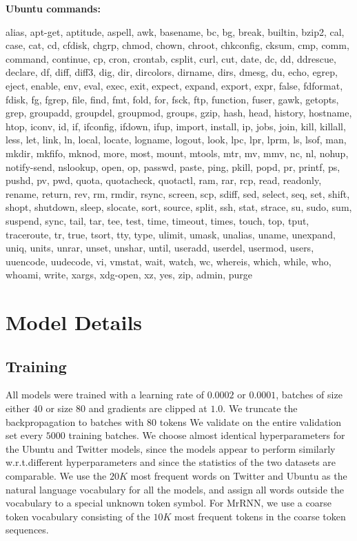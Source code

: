 \documentclass{article}
\begin{document}
\textbf{Ubuntu commands:}
\begin{framed}
\scriptsize
alias, apt-get, aptitude, aspell, awk, basename, bc, bg, break, builtin, bzip2, cal, case, cat, cd, cfdisk, chgrp, chmod, chown, chroot, chkconfig, cksum, cmp, comm, command, continue, cp, cron, crontab, csplit, curl, cut, date, dc, dd, ddrescue, declare, df, diff, diff3, dig, dir, dircolors, dirname, dirs, dmesg, du, echo, egrep, eject, enable, env, eval, exec, exit, expect, expand, export, expr, false, fdformat, fdisk, fg, fgrep, file, find, fmt, fold, for, fsck, ftp, function, fuser, gawk, getopts, grep, groupadd, groupdel, groupmod, groups, gzip, hash, head, history, hostname, htop, iconv, id, if, ifconfig, ifdown, ifup, import, install, ip, jobs, join, kill, killall, less, let, link, ln, local, locate, logname, logout, look, lpc, lpr, lprm, ls, lsof, man, mkdir, mkfifo, mknod, more, most, mount, mtools, mtr, mv, mmv, nc, nl, nohup, notify-send, nslookup, open, op, passwd, paste, ping, pkill, popd, pr, printf, ps, pushd, pv, pwd, quota, quotacheck, quotactl, ram, rar, rcp, read, readonly, rename, return, rev, rm, rmdir, rsync, screen, scp, sdiff, sed, select, seq, set, shift, shopt, shutdown, sleep, slocate, sort, source, split, ssh, stat, strace, su, sudo, sum, suspend, sync, tail, tar, tee, test, time, timeout, times, touch, top, tput, traceroute, tr, true, tsort, tty, type, ulimit, umask, unalias, uname, unexpand, uniq, units, unrar, unset, unshar, until, useradd, userdel, usermod, users, uuencode, uudecode, vi, vmstat, wait, watch, wc, whereis, which, while, who, whoami, write, xargs, xdg-open, xz, yes, zip, admin, purge
\end{framed}

\newpage

\section{Model Details} \label{app:model_details}

\subsection*{Training}

All models were trained with a learning rate of $0.0002$ or $0.0001$, batches of size either $40$ or size $80$ and gradients are clipped at $1.0$.
We truncate the backpropagation to batches with $80$ tokens
We validate on the entire validation set every $5000$ training batches.
We choose almost identical hyperparameters for the Ubuntu and Twitter models, since the models appear to perform similarly w.r.t.\@ different hyperparameters and since the statistics of the two datasets are comparable.
We use the $20K$ most frequent words on Twitter and Ubuntu as the natural language vocabulary for all the models, and assign all words outside the vocabulary to a special unknown token symbol.
For MrRNN, we use a coarse token vocabulary consisting of the $10K$ most frequent tokens in the coarse token sequences.
\end{document}
